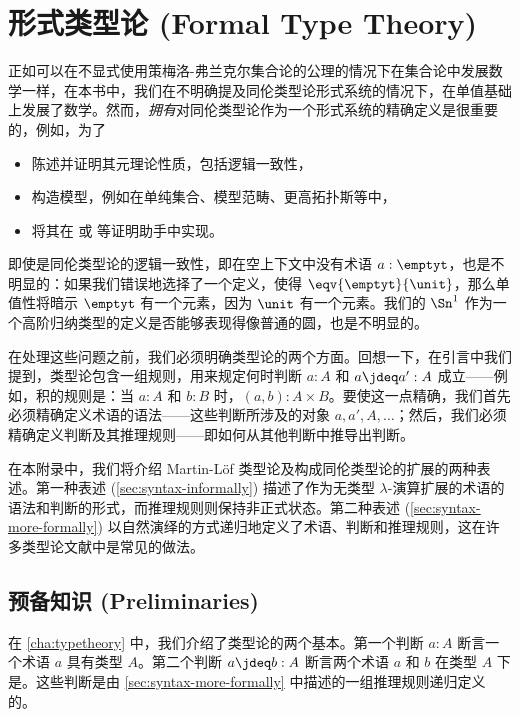 \chapter{形式类型论 (Formal Type Theory)}
\label{cha:rules}

%
%
%

正如可以在不显式使用策梅洛-弗兰克尔集合论的公理的情况下在集合论中发展数学一样，在本书中，我们在不明确提及同伦类型论形式系统的情况下，在单值基础上发展了数学。然而，\emph{拥有}对同伦类型论作为一个形式系统的精确定义是很重要的，例如，为了

\begin{itemize}
  \item 陈述并证明其元理论性质，包括逻辑一致性，
  \item 构造模型，例如在单纯集合、模型范畴、更高拓扑斯等中，\item 将其在 \Coq 或 \Agda 等证明助手中实现。
\end{itemize}
%
即使是同伦类型论的逻辑一致性，即在空上下文中没有术语 $a:\emptyt$，也是不明显的：如果我们错误地选择了一个定义，使得 $\eqv{\emptyt}{\unit}$，那么单值性将暗示 $\emptyt$ 有一个元素，因为 $\unit$ 有一个元素。我们的 $\Sn^1$ 作为一个高阶归纳类型的定义是否能够表现得像普通的圆，也是不明显的。

在处理这些问题之前，我们必须明确类型论的两个方面。回想一下，在引言中我们提到，类型论包含一组规则，用来规定何时判断 $a:A$ 和 $a\jdeq a':A$ 成立——例如，积的规则是：当 $a:A$ 和 $b:B$ 时，$(a,b):A\times B$。要使这一点精确，我们首先必须精确定义术语的语法——这些判断所涉及的对象 $a,a',A,\dots$；然后，我们必须精确定义判断及其推理规则——即如何从其他判断中推导出判断。

在本附录中，我们将介绍 Martin-L\"{o}f 类型论及构成同伦类型论的扩展的两种表述。第一种表述 (\cref{sec:syntax-informally}) 描述了作为无类型 $\lambda$-演算扩展的术语的语法和判断的形式，而推理规则则保持非正式状态。第二种表述 (\cref{sec:syntax-more-formally}) 以自然演绎的方式递归地定义了术语、判断和推理规则，这在许多类型论文献中是常见的做法。

\section*{预备知识 (Preliminaries)}
\label{sec:formal-prelim}

在 \cref{cha:typetheory} 中，我们介绍了类型论的两个基本。第一个判断 $a:A$ 断言一个术语 $a$ 具有类型 $A$。第二个判断 $a\jdeq b:A$ 断言两个术语 $a$ 和 $b$ 在类型 $A$ 下是。这些判断是由 \cref{sec:syntax-more-formally} 中描述的一组推理规则递归定义的。

